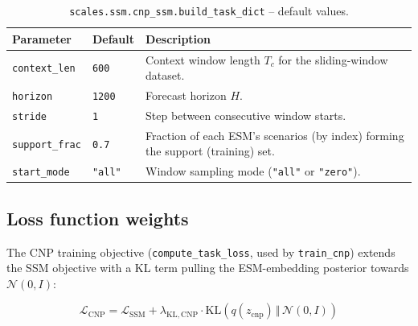 \documentclass[11pt]{article}
\begin{document}
\begin{table}[h]
\centering
\caption{\texttt{scales.ssm.cnp\_ssm.build\_task\_dict} -- default values.}
\begin{tabular}{@{}llL{7cm}@{}}
\toprule
Parameter & Default & Description \\
\midrule
\texttt{context\_len}  & \texttt{600}  & Context window length $T_c$ for the sliding-window dataset. \\
\texttt{horizon}       & \texttt{1200} & Forecast horizon $H$. \\
\texttt{stride}        & \texttt{1}    & Step between consecutive window starts. \\
\texttt{support\_frac} & \texttt{0.7}  & Fraction of each ESM's scenarios (by index) forming the support (training) set. \\
\texttt{start\_mode}   & \texttt{"all"} & Window sampling mode (\texttt{"all"} or \texttt{"zero"}). \\
\bottomrule
\end{tabular}
\end{table}

\subsection{Loss function weights}

The CNP training objective (\texttt{compute\_task\_loss}, used by
\texttt{train\_cnp}) extends the SSM objective with a KL term pulling the
ESM-embedding posterior towards $\mathcal{N}(0, I)$:

\begin{equation}
\mathcal{L}_{\mathrm{CNP}} = \mathcal{L}_{\mathrm{SSM}}
  + \lambda_{\mathrm{KL,CNP}} \cdot \mathrm{KL}\!\left(q(z_{\mathrm{cnp}}) \,\Vert\, \mathcal{N}(0, I)\right)
\end{equation}
\end{document}
